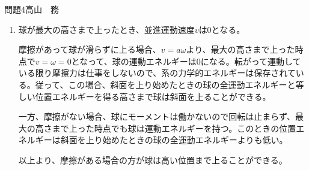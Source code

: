 \documentclass[fleqn]{jbook}
\begin{document}
\begin{answer}{問題4}{高山　務}
\begin{enumerate}
従って、球が滑り出すような最小の$\theta$は
\begin{eqnarray}
Mg\mu\cos\theta = \frac{2Mg}{7}\sin\theta
\end{eqnarray}
によって与えられる。$\theta$を計算すると、
\begin{eqnarray}
\theta=\arctan\Bigl( \frac{7\mu}{2} \Bigl)
\end{eqnarray}
この場合、摩擦力は$f=Mg\mu\cos\theta$となり、$\dot{v}<a\dot{\omega}$となって球は空回りし始める。滑り出した後は$f=Mg\mu' \cos\theta<Mg\mu\cos\theta$より$\dot{v}<a\dot{\omega}$の関係が続くため、球は空回りし続けることになる。
\item
球が最大の高さまで上ったとき、並進運動速度$v$は0となる。

摩擦があって球が滑らずに上る場合、$v=a\omega$より、最大の高さまで上った時点で$v=\omega=0$となって、球の運動エネルギーは0になる。転がって運動している限り摩擦力は仕事をしないので、系の力学的エネルギーは保存されている。従って、この場合、斜面を上り始めたときの球の全運動エネルギーと等しい位置エネルギーを得る高さまで球は斜面を上ることができる。

一方、摩擦がない場合、球にモーメントは働かないので回転は止まらず、最大の高さまで上った時点でも球は運動エネルギーを持つ。このときの位置エネルギーは斜面を上り始めたときの球の全運動エネルギーよりも低い。

以上より、摩擦がある場合の方が球は高い位置まで上ることができる。
\end{enumerate}
\end{answer}
\end{document}
